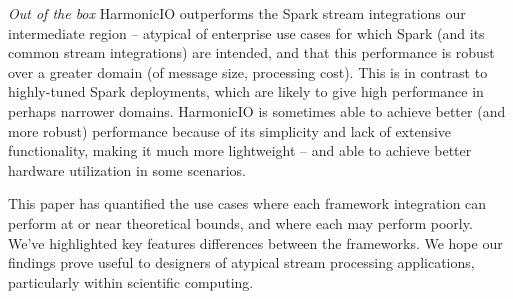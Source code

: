 \documentclass[conference]{IEEEtran}
\begin{document}
\emph{Out of the box} HarmonicIO outperforms the Spark stream integrations our intermediate region -- atypical of enterprise use cases for which Spark (and its common stream integrations) are intended, and that this performance is robust over a greater domain (of message size, processing cost). This is in contrast to highly-tuned Spark deployments, which are likely to give high performance in perhaps narrower domains. HarmonicIO is sometimes able to achieve better (and more robust) performance because of its simplicity and lack of extensive functionality, making it much more lightweight -- and able to achieve better hardware utilization in some scenarios.

This paper has quantified the use cases where each framework integration can perform at or near theoretical bounds, and where each may perform poorly. We've highlighted key features differences between the frameworks. We hope our findings prove useful 
to designers of atypical stream processing applications, particularly within scientific computing.

\end{document}
